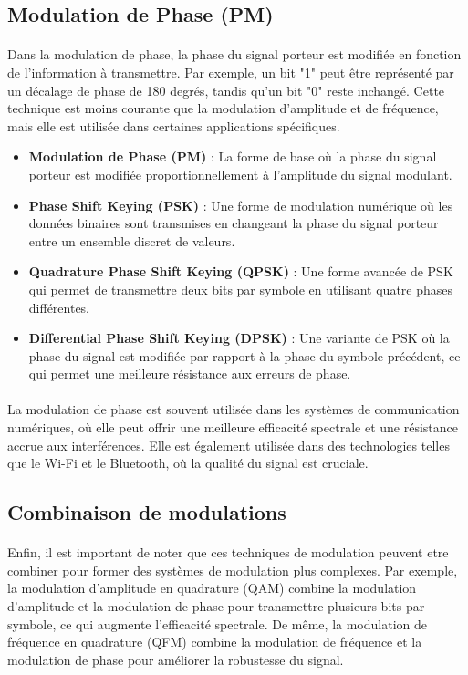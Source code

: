 \documentclass[a4paper,twocolumn]{report}
\begin{document}
\subsection{Modulation de Phase (PM)}
\paragraph{}Dans la modulation de phase, la phase du signal porteur est modifiée en fonction de l'information à transmettre. Par exemple, un bit "1" peut être représenté par un décalage de phase de 180 degrés, tandis qu'un bit "0" reste inchangé. Cette technique est moins courante que la modulation d'amplitude et de fréquence, mais elle est utilisée dans certaines applications spécifiques.
\begin{itemize}
    \item \textbf{Modulation de Phase (PM)} : La forme de base où la phase du signal porteur est modifiée proportionnellement à l'amplitude du signal modulant.
    \item \textbf{Phase Shift Keying (PSK)} : Une forme de modulation numérique où les données binaires sont transmises en changeant la phase du signal porteur entre un ensemble discret de valeurs.
    \item \textbf{Quadrature Phase Shift Keying (QPSK)} : Une forme avancée de PSK qui permet de transmettre deux bits par symbole en utilisant quatre phases différentes.
    \item \textbf{Differential Phase Shift Keying (DPSK)} : Une variante de PSK où la phase du signal est modifiée par rapport à la phase du symbole précédent, ce qui permet une meilleure résistance aux erreurs de phase.
\end{itemize}
\paragraph{}La modulation de phase est souvent utilisée dans les systèmes de communication numériques, où elle peut offrir une meilleure efficacité spectrale et une résistance accrue aux interférences. Elle est également utilisée dans des technologies telles que le Wi-Fi et le Bluetooth, où la qualité du signal est cruciale.

\subsection{Combinaison de modulations}
\paragraph{}Enfin, il est important de noter que ces techniques de modulation peuvent etre combiner pour former des systèmes de modulation plus complexes. Par exemple, la modulation d'amplitude en quadrature (QAM) combine la modulation d'amplitude et la modulation de phase pour transmettre plusieurs bits par symbole, ce qui augmente l'efficacité spectrale. De même, la modulation de fréquence en quadrature (QFM) combine la modulation de fréquence et la modulation de phase pour améliorer la robustesse du signal.
\end{document}
